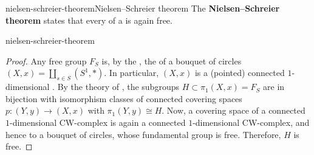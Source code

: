 \begin{topic}{nielsen-schreier-theorem}{Nielsen--Schreier theorem}
    The \textbf{Nielsen--Schreier theorem} states that every  of a  is again free.
\end{topic}

\begin{example}{nielsen-schreier-theorem}
    \begin{proof}
        Any free group $F_S$ is, by the , the  of a bouquet of circles $(X, x) = \coprod_{s \in S} (S^1, *)$. In particular, $(X, x)$ is a (pointed) connected $1$-dimensional . By the theory of , the subgroups $H \subset \pi_1(X, x) = F_S$ are in bijection with isomorphism classes of connected covering spaces $p \colon (Y, y) \to (X, x)$ with $\pi_1(Y, y) \cong H$. Now, a covering space of a connected $1$-dimensional CW-complex is again a connected $1$-dimensional CW-complex, and hence  to a bouquet of circles, whose fundamental group is free. Therefore, $H$ is free.
    \end{proof}
\end{example}

